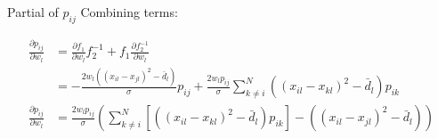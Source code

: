 \documentclass[12pt, a4paper]{article}
\begin{document}
\begin{section}{Partial of $p_{ij}$}
    Combining terms:

    \begin{align*}
        \frac{\partial p_{ij}}{\partial w_l}
        &= 
            \frac{\partial f_1}{\partial w_l} f_2^{-1} +
            f_1 \frac{\partial f_2^{-1}}{\partial w_l} \\
        &= 
        - \frac{ 2w_l\left ( (x_{il} - x_{jl})^2 - \bar d_l \right )}{\sigma}
        p_{ij} + \frac{2w_l p_{ij}}{\sigma} \sum \limits_{k \neq i}^N
        \left ( (x_{il} - x_{kl})^2 - \bar d_l \right ) p_{ik} \\
        \frac{\partial p_{ij}}{\partial w_l}
        &= \frac{2 w_l p_{ij}}{\sigma} 
            \left (
                \sum \limits_{k \neq i}^N
                \left [ \left ( (x_{il} - x_{kl})^2 - \bar d_l \right ) p_{ik}
                \right ] -
                \left ( (x_{il} - x_{jl})^2 - \bar d_l \right )
            \right )
    \end{align*}
\end{section}
\end{document}
